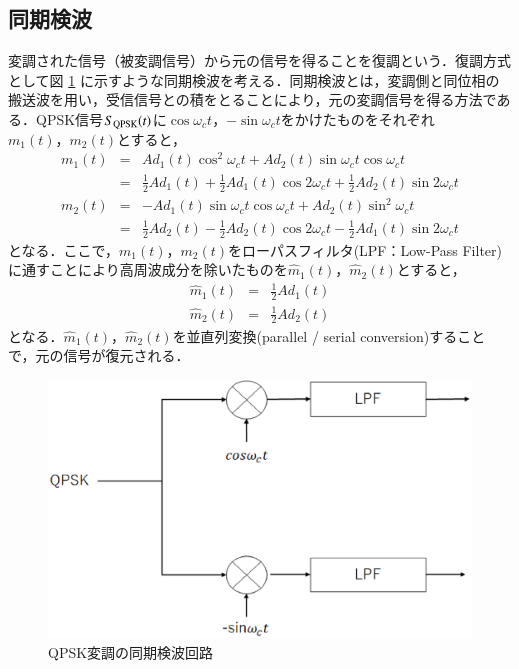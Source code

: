 \subsection{同期検波}
変調された信号（被変調信号）から元の信号を得ることを復調という．復調方式として図 \ref{fig:qpskcoh} に示すような同期検波を考える．同期検波とは，変調側と同位相の搬送波を用い，受信信号との積をとることにより，元の変調信号を得る方法である\cite{takahata}．QPSK信号$S_{{\rm QPSK}}(t)$に$\cos\omega_c t$，$-\sin\omega_c t$をかけたものをそれぞれ$m_1(t)， m_2(t)$とすると，
\begin{eqnarray}
m_1(t)&=&Ad_1(t)\cos^2\omega_ct+Ad_2(t)\sin\omega_ct\cos\omega_ct \nonumber \\
&=&\frac{1}{2}Ad_1(t)+\frac{1}{2}Ad_1(t)\cos2\omega_ct+\frac{1}{2}Ad_2(t)\sin2\omega_ct \\
m_2(t)&=&-Ad_1(t)\sin\omega_ct\cos\omega_ct+Ad_2(t)\sin^2\omega_ct \nonumber \\
&=&\frac{1}{2}Ad_2(t)-\frac{1}{2}Ad_2(t)\cos2\omega_ct-\frac{1}{2}Ad_1(t)\sin2\omega_ct
\end{eqnarray}
となる．ここで，$m_1(t)$，$m_2(t)$をローパスフィルタ(LPF：Low-Pass Filter)に通すことにより高周波成分を除いたものを$\hat{m}_1(t)$，$\hat{m}_2(t)$とすると，
\begin{eqnarray}
\hat{m}_1(t)&=&\frac{1}{2}Ad_1(t)\\
\hat{m}_2(t)&=&\frac{1}{2}Ad_2(t)
\end{eqnarray}
となる．$\hat{m}_1(t)$，$\hat{m}_2(t)$を並直列変換(parallel / serial conversion)することで，元の信号が復元される．
\begin{figure}[t]
  \begin{center}
    \includegraphics[width=0.6\linewidth]{chapter2/figure/douki.eps}
    \caption{QPSK変調の同期検波回路}
    \label{fig:qpskcoh}
  \end{center}
\end{figure}

